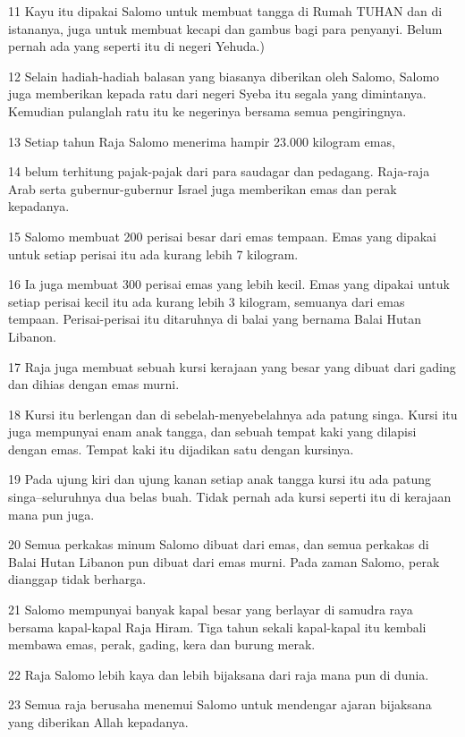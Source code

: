 \par 11 Kayu itu dipakai Salomo untuk membuat tangga di Rumah TUHAN dan di istananya, juga untuk membuat kecapi dan gambus bagi para penyanyi. Belum pernah ada yang seperti itu di negeri Yehuda.)
\par 12 Selain hadiah-hadiah balasan yang biasanya diberikan oleh Salomo, Salomo juga memberikan kepada ratu dari negeri Syeba itu segala yang dimintanya. Kemudian pulanglah ratu itu ke negerinya bersama semua pengiringnya.
\par 13 Setiap tahun Raja Salomo menerima hampir 23.000 kilogram emas,
\par 14 belum terhitung pajak-pajak dari para saudagar dan pedagang. Raja-raja Arab serta gubernur-gubernur Israel juga memberikan emas dan perak kepadanya.
\par 15 Salomo membuat 200 perisai besar dari emas tempaan. Emas yang dipakai untuk setiap perisai itu ada kurang lebih 7 kilogram.
\par 16 Ia juga membuat 300 perisai emas yang lebih kecil. Emas yang dipakai untuk setiap perisai kecil itu ada kurang lebih 3 kilogram, semuanya dari emas tempaan. Perisai-perisai itu ditaruhnya di balai yang bernama Balai Hutan Libanon.
\par 17 Raja juga membuat sebuah kursi kerajaan yang besar yang dibuat dari gading dan dihias dengan emas murni.
\par 18 Kursi itu berlengan dan di sebelah-menyebelahnya ada patung singa. Kursi itu juga mempunyai enam anak tangga, dan sebuah tempat kaki yang dilapisi dengan emas. Tempat kaki itu dijadikan satu dengan kursinya.
\par 19 Pada ujung kiri dan ujung kanan setiap anak tangga kursi itu ada patung singa--seluruhnya dua belas buah. Tidak pernah ada kursi seperti itu di kerajaan mana pun juga.
\par 20 Semua perkakas minum Salomo dibuat dari emas, dan semua perkakas di Balai Hutan Libanon pun dibuat dari emas murni. Pada zaman Salomo, perak dianggap tidak berharga.
\par 21 Salomo mempunyai banyak kapal besar yang berlayar di samudra raya bersama kapal-kapal Raja Hiram. Tiga tahun sekali kapal-kapal itu kembali membawa emas, perak, gading, kera dan burung merak.
\par 22 Raja Salomo lebih kaya dan lebih bijaksana dari raja mana pun di dunia.
\par 23 Semua raja berusaha menemui Salomo untuk mendengar ajaran bijaksana yang diberikan Allah kepadanya.
